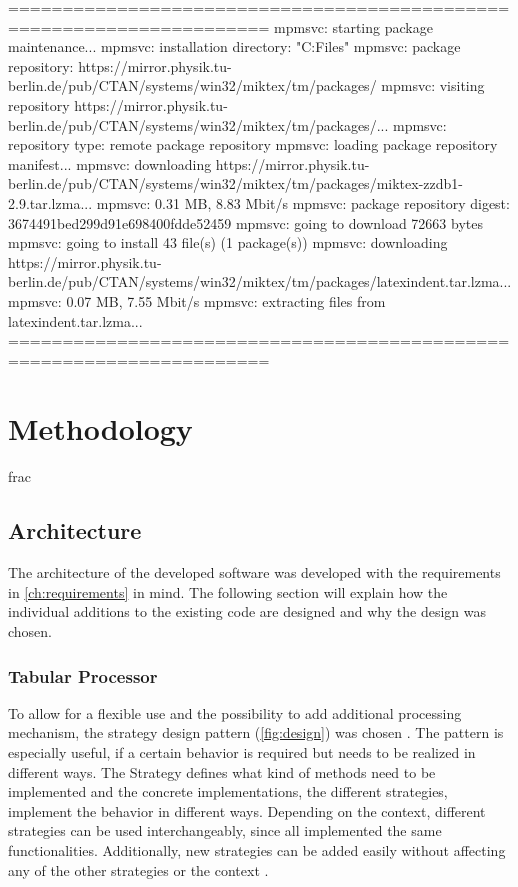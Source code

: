 
======================================================================
mpmsvc: starting package maintenance...
mpmsvc: installation directory: "C:\Program Files"
mpmsvc: package repository: https://mirror.physik.tu-berlin.de/pub/CTAN/systems/win32/miktex/tm/packages/
mpmsvc: visiting repository https://mirror.physik.tu-berlin.de/pub/CTAN/systems/win32/miktex/tm/packages/...
mpmsvc: repository type: remote package repository
mpmsvc: loading package repository manifest...
mpmsvc: downloading https://mirror.physik.tu-berlin.de/pub/CTAN/systems/win32/miktex/tm/packages/miktex-zzdb1-2.9.tar.lzma...
mpmsvc: 0.31 MB, 8.83 Mbit/s
mpmsvc: package repository digest: 3674491bed299d91e698400fdde52459
mpmsvc: going to download 72663 bytes
mpmsvc: going to install 43 file(s) (1 package(s))
mpmsvc: downloading https://mirror.physik.tu-berlin.de/pub/CTAN/systems/win32/miktex/tm/packages/latexindent.tar.lzma...
mpmsvc: 0.07 MB, 7.55 Mbit/s
mpmsvc: extracting files from latexindent.tar.lzma...
======================================================================
\chapter{Methodology}
\label{ch:methodology}frac


\section*{Architecture}
\label{ch:architecture}

The architecture of the developed software was developed with the requirements in \autoref{ch:requirements} in mind.
The following section will explain how the individual additions to the existing code are designed and why the design was chosen.


\subsection[]{Tabular Processor}
\label{ch:architecture-tabularProcessor}

To allow for a flexible use and the possibility to add additional processing mechanism, the strategy design pattern (\autoref{fig:design}) was chosen \cite{gamma1994design}.
The pattern is especially useful, if a certain behavior is required but needs to be realized in different ways.
The Strategy defines what kind of methods need to be implemented and the concrete implementations, the different strategies, implement the behavior in different ways.
Depending on the context, different strategies can be used interchangeably, since all implemented the same functionalities.
Additionally, new strategies can be added easily without affecting any of the other strategies or the context \cite{gamma1994design}.

